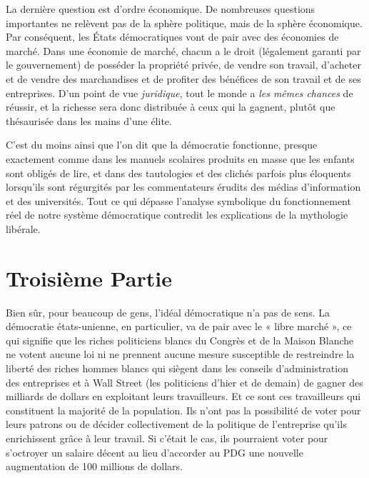 La dernière question est d'ordre économique. De nombreuses questions importantes ne relèvent pas de la sphère politique, mais de la sphère économique. Par conséquent, les États démocratiques vont de pair avec des économies de marché. Dans une économie de marché, chacun a le droit (légalement garanti par le gouvernement) de posséder la propriété privée, de vendre son travail, d'acheter et de vendre des marchandises et de profiter des bénéfices de son travail et de ses entreprises. D'un point de vue \emph{juridique}, tout le monde a \emph{les mêmes chances} de réussir, et la richesse sera donc distribuée à ceux qui la gagnent, plutôt que thésaurisée dans les mains d'une élite.

C'est du moins ainsi que l'on dit que la démocratie fonctionne, presque exactement comme dans les manuels scolaires produits en masse que les enfants sont obligés de lire, et dans des tautologies et des clichés parfois plus éloquents lorsqu'ils sont régurgités par les commentateurs érudits des médias d'information et des universités. Tout ce qui dépasse l'analyse symbolique du fonctionnement réel de notre système démocratique contredit les explications de la mythologie libérale.

\chapter*{\textbf{Troisième Partie}}

Bien sûr, pour beaucoup de gens, l'idéal démocratique n'a pas de sens. La démocratie états-unienne, en particulier, va de pair avec le « libre marché », ce qui signifie que les riches politiciens blancs du Congrès et de la Maison Blanche ne votent aucune loi ni ne prennent aucune mesure susceptible de restreindre la liberté des riches hommes blancs qui siègent dans les conseils d'administration des entreprises et à Wall Street (les politiciens d'hier et de demain) de gagner des milliards de dollars en exploitant leurs travailleurs. Et ce sont ces travailleurs qui constituent la majorité de la population. Ils n'ont pas la possibilité de voter pour leurs patrons ou de décider collectivement de la politique de l'entreprise qu'ils enrichissent grâce à leur travail. Si c'était le cas, ils pourraient voter pour s'octroyer un salaire décent au lieu d'accorder au PDG une nouvelle augmentation de 100 millions de dollars.


